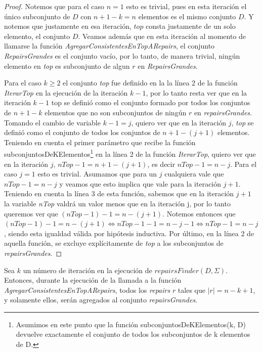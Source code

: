 \documentclass[11pt,a4paper,twoside]{tesis}
\begin{document}
\begin{proof}
Notemos que para el caso $n=1$ esto es trivial, pues en esta iteración el único subconjunto de $D$ con $n + 1 - k = n$ elementos es el mismo conjunto $D$. Y notemos que justamente en esa iteración, $top$ consta justamente de un solo elemento, el conjunto $D$. Veamos además que en esta iteración al momento de llamarse la función \textit{AgregarConsistentesEnTopARepairs}, el conjunto \textit{RepairsGrandes} es el conjunto vacío, por lo tanto, de manera trivial, ningún elemento en \textit{top} es subconjunto de algun $r$ en \textit{RepairsGrandes}.

Para el caso $k \geq 2$ el conjunto \textit{top} fue definido en la la línea 2 de la función \textit{IterarTop} en la ejecución de la iteración $k-1$, por lo tanto resta ver que en la iteración $k-1$ top se definió como el conjunto formado por todos los conjuntos de $n + 1 - k$ elementos que no son subconjuntos de ningún $r$ en \textit{repairsGrandes}. Tomando el cambio de variable $k - 1 = j$, quiero ver que en la iteración $j$, \textit{top} se definió como el conjunto de  todos los conjuntos de $n + 1 - (j + 1)$ elementos. Teniendo en cuenta el primer parámetro que recibe la función subconjuntosDeKElementos\footnote{Asumimos en este punto que la función subconjuntosDeKElementos(k, D) devuelve exactamente el conjunto de todos los subconjuntos de k elementos de D.} en la línea 2 de la función \textit{IterarTop}, quiero ver que en la iteración $j$, $nTop-1=n + 1 - (j + 1)$, es decir $nTop-1=n-j$. Para el caso $j=1$ esto es trivial. Asumamos que para un $j$ cualquiera vale que $nTop-1=n-j$ y veamos que esto implica que vale para la iteración $j+1$. Teniendo en cuenta la línea 3 de esta función, sabemos que en la iteración $j+1$ la variable \textit{nTop} valdrá un valor menos que en la iteración j, por lo tanto queremos ver que $(nTop-1) - 1 = n - (j+1)$. Notemos entonces que $(nTop-1) - 1 = n - (j+1) \iff nTop-1 - 1 = n - j -1 \iff nTop-1 = n - j$, siendo esta igualdad válida por hipótesis inductiva.
Por último, en la línea 2 de aquella función, se excluye explícitamente de \textit{top} a los subconjuntos de \textit{repairsGrandes}.
\end{proof}

\begin{lemma}\label{repairs_grandes_agregados_en_iteracion_k}
Sea $k$ un número de iteración en la ejecución de $repairsFinder(D, \Sigma)$. Entonces, durante la ejecución de la llamada a la función \textit{AgregarConsistentesEnTopARepairs}, todos los \textit{repairs} $r$ tales que $|r| = n - k + 1$, y solamente ellos, serán agregados al conjunto \textit{repairsGrandes}. 
\end{lemma}
\end{document}
